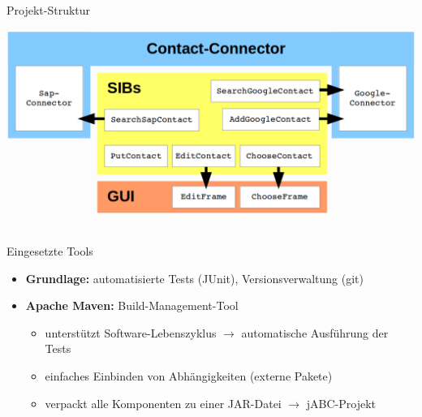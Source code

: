 \begin{frame}{Projekt-Struktur}
	
\begin{center}
\includegraphics[width=\textwidth]{Bilder/projekt_aufbau.png} 
\end{center}

\end{frame}


\subsection*{}
\begin{frame}{Eingesetzte Tools}
\begin{itemize}
	
	\item \textbf{Grundlage:} automatisierte Tests (JUnit), Versionsverwaltung (git)
	\pause
	\item \textbf{Apache Maven:} Build-Management-Tool
		\begin{itemize}
			
			\item unterstützt Software-Lebenszyklus $\rightarrow$ automatische Ausführung der Tests
			\item einfaches Einbinden von Abhängigkeiten (externe Pakete)
			\item verpackt alle Komponenten zu einer JAR-Datei $\rightarrow$ jABC-Projekt
		\end{itemize}
\end{itemize}

\end{frame}











